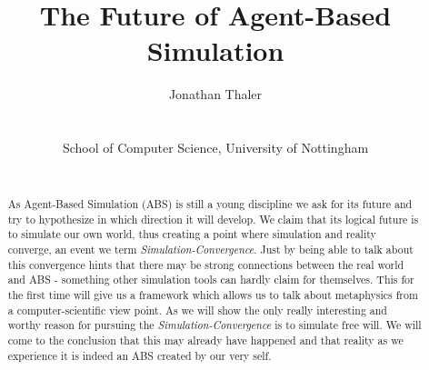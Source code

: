 \documentclass[a4paper, 10pt, conference]{../../templates/IEEEconf/IEEEconf}
\title{The Future of Agent-Based Simulation}
\author{
	Jonathan Thaler \\
	\email{jonathan.thaler@nottingham.ac.uk} \\
	\begin{affiliation}
		School of Computer Science, University of Nottingham
	\end{affiliation} \\
}
\begin{document}
\maketitle

\begin{abstract}
As Agent-Based Simulation (ABS) is still a young discipline we ask for its future and try to hypothesize in which direction it will develop. We claim that its logical future is to simulate our own world, thus creating a point where simulation and reality converge, an event we term \textit{Simulation-Convergence}.
Just by being able to talk about this convergence hints that there may be strong connections between the real world and ABS - something other simulation tools can hardly claim for themselves. This for the first time will give us a framework which allows us to talk about metaphysics from a computer-scientific view point.
As we will show the only really interesting and worthy reason for pursuing the \textit{Simulation-Convergence} is to simulate free will. We will come to the conclusion that this may already have happened and that reality as we experience it is indeed an ABS created by our very self.
\end{abstract}











\end{document}
